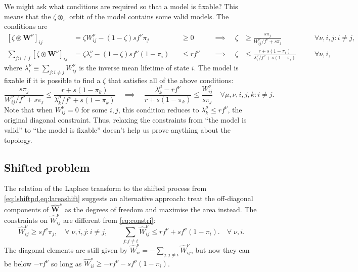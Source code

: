 \documentclass[12pt]{article}
\newcommand{\eqm}{\pi}
\newcommand{\lbm}{\lambda}
\newcommand{\Wm}{W}
\newcommand{\W}{\mathbf{\Wm}}
\newcommand{\shift}[1]{\widehat{#1}}
\begin{document}
We might ask what conditions are required so that a model is fixable?
This means that the \(\zeta \circledast_s \) orbit of the model contains some valid models.
The conditions are
%
\begin{equation*}
\begin{alignedat}{5}
  [\zeta \circledast \W^\nu]_{ij}  
    &= \zeta \Wm^\nu_{ij} - (1-\zeta) s f^\nu \eqm_j 
    &&\geq 0 &
  \;\; &\implies \;\; &
  \zeta &\geq \frac{s \eqm_j}{\Wm^\nu_{ij} /  f^\nu + s \eqm_j} &
    &\forall \nu, i, j : i \neq j , \\
  \sum_{j : i \neq j} [\zeta \circledast \W^\nu]_{ij} 
    &= \zeta \lbm^\nu_i - (1-\zeta) s f^\nu (1-\eqm_i) 
    &&\leq r f^\nu &
  &\implies &
  \zeta &\leq \frac{r + s (1-\eqm_i)}{\lbm^\nu_i / f^\nu + s (1-\eqm_i)} &
    \quad &\forall \nu, i ,
\end{alignedat}
\end{equation*}
%
where \(\lbm^\nu_i \equiv \sum_{j : i \neq j} \Wm^\nu_{ij}\) is the inverse mean  lifetime of state \(i\).
The model is fixable if it is possible to find a \(\zeta\) that satisfies all of the above conditions:
%
\begin{equation}\label{eq:fixable}
  \frac{s \eqm_j}{\Wm^\nu_{ij} / f^\nu + s \eqm_j} \leq \frac{r + s (1-\eqm_k)}{\lbm^\mu_k / f^\nu + s (1-\eqm_k)}
  \quad \implies \quad
  \frac{\lbm^\mu_k - r f^\nu}{r + s (1-\eqm_k)} \leq \frac{\Wm^\nu_{ij}}{s \eqm_j} 
  \quad \forall \mu, \nu, i, j, k : i \neq j.
\end{equation}
%
Note that when \(\Wm^\nu_{ij} = 0\) for some \(i,j \), this condition reduces to \(\lbm^\mu_k \leq r f^\nu\), the original diagonal constraint.
Thus, relaxing the constraints from ``the model is valid'' to ``the model is fixable'' doesn't help us prove anything about the topology.



\subsection{Shifted problem}\label{sec:lshift}

The relation of the Laplace transform to the shifted process from \cref{eq:lshiftpd,eq:lareashift} suggests an alternative approach: 
treat the off-diagonal components of \(\shift{\W}^\nu \) as the degrees of freedom and maximise the area instead.
The constraints on \(\shift{\Wm}^\nu_{ij}\) are different from \cref{eq:constri}:
%
\begin{equation}\label{eq:lshiftconstr}
  \shift{\Wm}^\nu_{ij} \geq s f^\nu \eqm_j,
    \quad \forall \; \nu, i, j : i \neq j, \qquad
  \sum_{j: j \neq i} \shift{\Wm}^\nu_{ij} \leq r f^\nu + s f^\nu (1 - \eqm_i).
    \quad \forall \; \nu, i.
\end{equation}
%
The diagonal elements are still given by \( \shift{\Wm}^\nu_{ii} = - \sum_{j: j \neq i} \shift{\Wm}^\nu_{ij} \), but now they can be below \(-r f^\nu \) so long as \(\shift{\Wm}^\nu_{ii} \geq -r f^\nu - s f^\nu (1 - \eqm_i)\).
\end{document}
